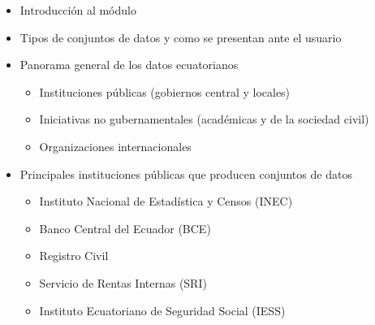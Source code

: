 \documentclass[
  letterpaper,
  DIV=11,
  numbers=noendperiod]{scrartcl}
\providecommand{\tightlist}{%
  \setlength{\itemsep}{0pt}\setlength{\parskip}{0pt}}\usepackage{longtable,booktabs,array}
\begin{document}
\begin{itemize}
\item
  Introducción al módulo
\item
  Tipos de conjuntos de datos y como se presentan ante el usuario
\item
  Panorama general de los datos ecuatorianos

  \begin{itemize}
  \tightlist
  \item
    Instituciones públicas (gobiernos central y locales)
  \item
    Iniciativas no gubernamentales (académicas y de la sociedad civil)
  \item
    Organizaciones internacionales
  \end{itemize}
\item
  Principales instituciones públicas que producen conjuntos de datos

  \begin{itemize}
  \tightlist
  \item
    Instituto Nacional de Estadística y Censos (INEC)
  \item
    Banco Central del Ecuador (BCE)
  \item
    Registro Civil
  \item
    Servicio de Rentas Internas (SRI)
  \item
    Instituto Ecuatoriano de Seguridad Social (IESS)
  \end{itemize}
\end{itemize}
\end{document}
